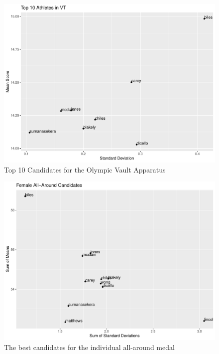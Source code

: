 \documentclass[12pt]{article}
\begin{document}
\begin{figure}[tbp]
  \centering
  \includegraphics[scale=0.6]{Top10AthletesVT.pdf}
  \caption{Top 10 Candidates for the Olympic Vault Apparatus}
  \label{fig:VT}
\end{figure}

\begin{figure}[tbp]
  \centering
  \includegraphics[scale=0.6]{AllAroundCandidates.pdf}
  \caption{The best candidates for the individual all-around medal}
  \label{fig:IAA}
\end{figure}
\end{document}
